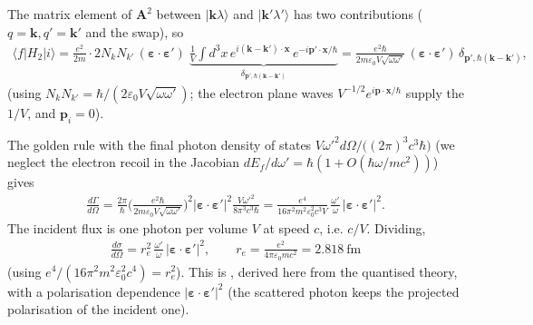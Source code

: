 \documentclass[letterpaper,10pt,english]{jupyterBook}
\begin{document}
\sphinxAtStartPar
{} The matrix element of \(\mathbf A^2\) between \(|\mathbf k\lambda\rangle\) and \(|\mathbf k'\lambda'\rangle\) has two contributions (\(q=\mathbf k,q'=\mathbf k'\) and the swap), so
\begin{equation*}
\begin{split}
\langle f|H_2|i\rangle=\frac{e^2}{2m}\cdot2N_kN_{k'}\,(\boldsymbol\varepsilon\!\cdot\!\boldsymbol\varepsilon')\;\underbrace{\frac1V\!\int d^3x\,e^{i(\mathbf k-\mathbf k')\cdot\mathbf x}\,e^{-i\mathbf p'\cdot\mathbf x/\hbar}}_{\delta_{\mathbf p',\hbar(\mathbf k-\mathbf k')}}
=\frac{e^2\hbar}{2m\varepsilon_0V\sqrt{\omega\omega'}}\,(\boldsymbol\varepsilon\!\cdot\!\boldsymbol\varepsilon')\,\delta_{\mathbf p',\hbar(\mathbf k-\mathbf k')},
\end{split}
\end{equation*}
\sphinxAtStartPar
(using \(N_kN_{k'}=\hbar/(2\varepsilon_0V\sqrt{\omega\omega'})\); the electron plane waves \(V^{-1/2}e^{i\mathbf p\cdot\mathbf x/\hbar}\) supply the \(1/V\), and \(\mathbf p_i=0\)).

\sphinxAtStartPar
{} The golden rule with the final photon density of states \(V\omega'^2d\Omega/\big((2\pi)^3c^3\hbar\big)\) (we neglect the electron recoil in the Jacobian \(dE_f/d\omega'=\hbar(1+O(\hbar\omega/mc^2))\)) gives
\begin{equation*}
\begin{split}
\frac{d\Gamma}{d\Omega}=\frac{2\pi}{\hbar}\Big(\frac{e^2\hbar}{2m\varepsilon_0V\sqrt{\omega\omega'}}\Big)^2|\boldsymbol\varepsilon\!\cdot\!\boldsymbol\varepsilon'|^2\frac{V\omega'^2}{8\pi^3c^3\hbar}
=\frac{e^4}{16\pi^2m^2\varepsilon_0^2c^3V}\,\frac{\omega'}{\omega}\,|\boldsymbol\varepsilon\!\cdot\!\boldsymbol\varepsilon'|^2 .
\end{split}
\end{equation*}
\sphinxAtStartPar
The incident flux is one photon per volume \(V\) at speed \(c\), i.e. \(c/V\). Dividing,
\begin{equation*}
\begin{split}
\boxed{\;\frac{d\sigma}{d\Omega}=r_e^2\,\frac{\omega'}{\omega}\,|\boldsymbol\varepsilon\!\cdot\!\boldsymbol\varepsilon'|^2,\qquad r_e=\frac{e^2}{4\pi\varepsilon_0mc^2}=2.818\ \text{fm}\;}
\end{split}
\end{equation*}
\sphinxAtStartPar
(using \(e^4/(16\pi^2m^2\varepsilon_0^2c^4)=r_e^2\)). This is , derived here from the quantised theory, with a polarisation dependence \(|\boldsymbol\varepsilon\!\cdot\!\boldsymbol\varepsilon'|^2\) (the scattered photon keeps the projected polarisation of the incident one).
\end{document}
